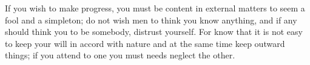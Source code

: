 If you wish to make progress, you must be content in external matters to seem a
fool and a  simpleton; do not wish men  to think you know anything,  and if any
should think  you to be  somebody, distrust yourself. For  know that it  is not
easy to keep your will in accord with  nature and at the same time keep outward
things; if you attend to one you must needs neglect the other.
